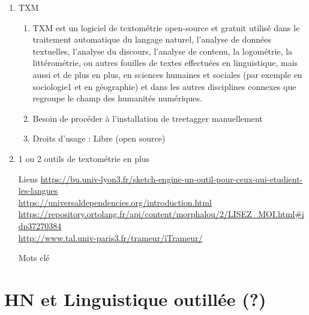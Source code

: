 \documentclass{book}
\begin{document}
\begin{enumerate}
	\item TXM
        \begin{enumerate}
            \item TXM est un logiciel de textométrie open-source et gratuit utilisé dans le traitement automatique du langage naturel, l'analyse de données textuelles, l'analyse du discours, l'analyse de contenu, la logométrie, la littérométrie, ou autres fouilles de textes effectuées en linguistique, mais aussi et de plus en plus, en sciences humaines et sociales (par exemple en sociologie1 et en géographie) et dans les autres disciplines connexes que regroupe le champ des humanités numériques.
            \item Besoin de procéder à l'installation de treetagger manuellement
            \item Droits d'usage : Libre (open source)
        \end{enumerate}
        
    \item 1 ou 2 outils de textométrie en plus
    
\end{enumerate}

    


\begin{itemize}
    \item [Liens]
        \url{https://bu.univ-lyon3.fr/sketch-engine-un-outil-pour-ceux-qui-etudient-les-langues}\\
        \url{https://universaldependencies.org/introduction.html}\\
        \url{https://repository.ortolang.fr/api/content/morphalou/2/LISEZ_MOI.html#idp37270384}\\
        \url{http://www.tal.univ-paris3.fr/trameur/iTrameur/}
        \autocite{pincemin:halshs-02902088}\\
        
    \item [Mots clé]
\end{itemize}

\section{HN et Linguistique outillée (?) }%
\end{document}
